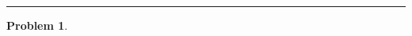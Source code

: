 \documentclass[a4paper, 10pt]{article}
\theoremstyle{definition}
\newtheorem{problem}{Problem}
\theoremstyle{hSol}
\begin{document}
\noindent\rule{16cm}{0.4pt}
\begin{problem} 
\end{problem}
\end{document}

